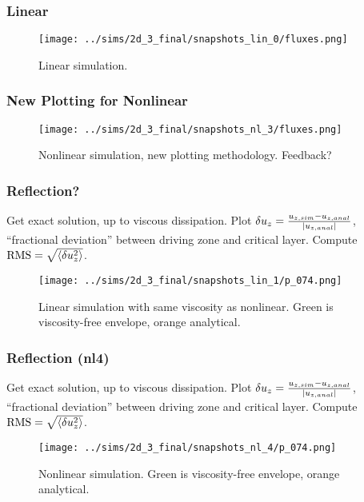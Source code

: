 \documentclass[dvipsnames]{beamer}
\DeclarePairedDelimiter\abs{\lvert}{\rvert}
\DeclarePairedDelimiter\ev{\langle}{\rangle}
\begin{document}
\begin{frame}
    \frametitle{Linear}

    \begin{figure}[t]
        \centering
        \texttt{[image: ../sims/2d\_3\_final/snapshots\_lin\_0/fluxes.png]}
        \caption{Linear simulation.}
    \end{figure}
\end{frame}

\begin{frame}
    \frametitle{New Plotting for Nonlinear}

    \begin{figure}[t]
        \centering
        \texttt{[image: ../sims/2d\_3\_final/snapshots\_nl\_3/fluxes.png]}
        \caption{Nonlinear simulation, new plotting methodology. Feedback?}
    \end{figure}
\end{frame}

\begin{frame}
    \frametitle{Reflection?}

    Get exact solution, up to viscous dissipation. Plot $\delta u_z =
    \frac{u_{z,sim} - u_{z, anal}}{\abs*{u_{z, anal}}}$, ``fractional
    deviation'' between driving zone and critical layer. Compute $\mathrm{RMS} =
    \sqrt{\ev*{\delta u_z^2}}$.
    \begin{figure}[t]
        \centering
        \texttt{[image: ../sims/2d\_3\_final/snapshots\_lin\_1/p\_074.png]}
        \caption{Linear simulation with same viscosity as nonlinear. Green is
        viscosity-free envelope, orange analytical.}
    \end{figure}
\end{frame}

\begin{frame}
    \frametitle{Reflection (nl4)}

    Get exact solution, up to viscous dissipation. Plot $\delta u_z =
    \frac{u_{z,sim} - u_{z, anal}}{\abs*{u_{z, anal}}}$, ``fractional
    deviation'' between driving zone and critical layer. Compute $\mathrm{RMS} =
    \sqrt{\ev*{\delta u_z^2}}$.
    \begin{figure}[t]
        \centering
        \texttt{[image: ../sims/2d\_3\_final/snapshots\_nl\_4/p\_074.png]}
        \caption{Nonlinear simulation. Green is viscosity-free envelope, orange
        analytical.}
    \end{figure}
\end{frame}
\end{document}
